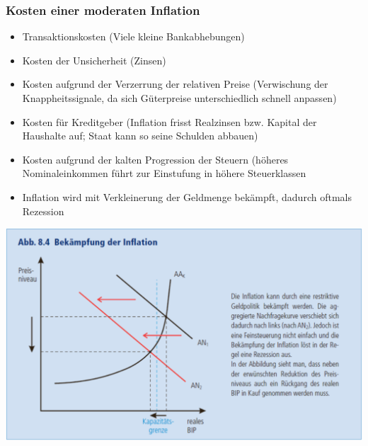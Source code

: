 \subsubsection{Kosten einer moderaten Inflation}
\begin{multicols}{2}
\begin{itemize}
	\item Transaktionskosten (Viele kleine Bankabhebungen) 
	\item Kosten der Unsicherheit (Zinsen)
	\item Kosten aufgrund der Verzerrung der relativen Preise (Verwischung der Knappheitssignale, da sich Güterpreise unterschiedlich schnell anpassen)
	\item Kosten für Kreditgeber (Inflation frisst Realzinsen bzw. Kapital der Haushalte auf; Staat kann so seine Schulden abbauen)
	\item Kosten aufgrund der kalten Progression der Steuern (höheres Nominaleinkommen führt zur Einstufung in höhere Steuerklassen
	\item Inflation wird mit Verkleinerung der Geldmenge bekämpft, dadurch oftmals Rezession
\end{itemize}
\columnbreak
\includegraphics[width=\linewidth]{images/inflationsbekaempfung.png}
\end{multicols}

